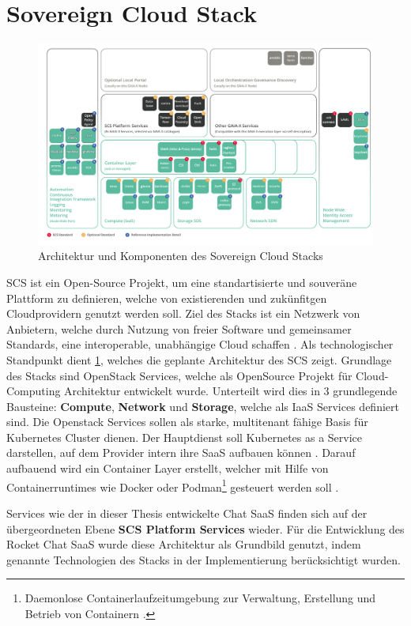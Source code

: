 \section{Sovereign Cloud Stack}
\label{sec:gaia-x-einbettung:scs}

\begin{figure}[h]
  \centering
  \includegraphics[height=0.71\textwidth]{gfx/chapters/4_gaia-X/scs_architecture.png}
  \caption{Architektur und Komponenten des Sovereign Cloud Stacks}
  \label{fig:scs_architecture}
\end{figure}

\ac{SCS} ist ein Open-Source Projekt, um eine standartisierte und souveräne Plattform zu definieren, welche von 
existierenden und zukünfitgen Cloudprovidern genutzt werden soll. 
Ziel des Stacks ist ein Netzwerk von Anbietern, welche durch Nutzung von freier Software und gemeinsamer Standards,
eine interoperable, unabhängige Cloud schaffen \cite{Kagermann2021}.
Als technologischer Standpunkt dient \ref{fig:scs_architecture}, welches die geplante Architektur des \ac{SCS} zeigt. 
Grundlage des Stacks sind OpenStack Services, welche als OpenSource Projekt für Cloud-Computing Architektur entwickelt wurde.
Unterteilt wird dies in 3 grundlegende Bausteine: \textbf{Compute}, \textbf{Network} und \textbf{Storage},
welche als \ac{IaaS} Services definiert sind.
Die Openstack Services sollen als starke, multitenant fähige Basis für Kubernetes Cluster dienen. 
Der Hauptdienst soll Kubernetes as a Service darstellen, auf dem Provider intern ihre \ac{SaaS} aufbauen können \cite{scs}.
Darauf aufbauend wird ein Container Layer erstellt, welcher mit Hilfe von Containerruntimes
wie Docker oder 
Podman\footnote{Daemonlose Containerlaufzeitumgebung zur Verwaltung, Erstellung und Betrieb von Containern \cite{podman}.}
gesteuert werden soll \cite{scs}.

Services wie der in dieser Thesis entwickelte Chat \ac{SaaS} finden sich auf der übergeordneten Ebene \textbf{SCS Platform Services} wieder.
Für die Entwicklung des Rocket Chat \ac{SaaS} wurde diese Architektur als Grundbild genutzt, indem 
genannte Technologien des Stacks in der Implementierung berücksichtigt wurden.